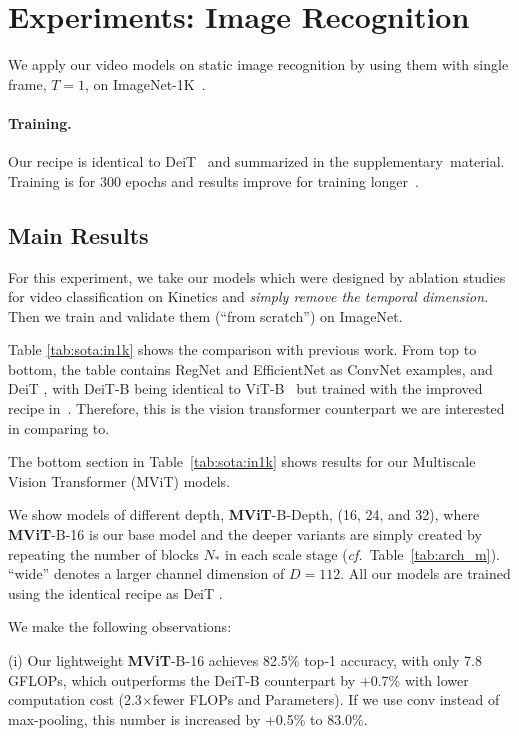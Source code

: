 \documentclass[10pt,twocolumn,letterpaper]{article}
\newcommand{\tblref}[1]{Table~\ref{#1}}
\def\x{$\times$}
\begin{document}
\section{Experiments: Image Recognition}\label{sec:imagenet}

We apply our video models on static image recognition by using them with single frame, $T=1$, on ImageNet-1K~\cite{Deng2009}.

\paragraph{Training.} Our recipe is identical to DeiT~\cite{touvron2020training} and summarized in the supplementary~material. Training  is for 300 epochs and results improve for training longer~\cite{touvron2020training}.

\subsection{Main Results}
For this experiment, we take our models which were designed by ablation studies for video classification on Kinetics and \textit{simply remove the temporal dimension}. Then we train and validate them (``from scratch'') on ImageNet.

Table \ref{tab:sota:in1k} shows the comparison with previous work. From top to bottom, the table contains RegNet \cite{ilija_2020}
and EfficientNet \cite{tan2019efficientnet} 
as ConvNet examples, and 
DeiT \cite{touvron2020training}, with  DeiT-B  being identical to ViT-B~\cite{dosovitskiy2020image} but trained with the improved recipe in~\cite{touvron2020training}. Therefore, this is the vision transformer counterpart we are interested in comparing to. 

The bottom section in \tblref{tab:sota:in1k} shows results for our Multiscale Vision Transformer (MViT) models. 

We show models of different depth, \textbf{MViT}-B-Depth, (16, 24, and 32), where \textbf{MViT}-B-16 is our base model and the deeper variants are simply created by repeating the number of blocks $N_*$ in each scale stage (\textit{cf.}~\tblref{tab:arch_m}). ``wide'' denotes a larger channel dimension of $D=112$. All our models are trained using the identical recipe as DeiT \cite{touvron2020training}.

We make the following observations: 

(i) Our lightweight \textbf{MViT}-B-16 achieves 82.5\% top-1 accuracy, with only 7.8 GFLOPs, which outperforms the DeiT-B counterpart by +0.7\% with lower computation cost (2.3\x fewer FLOPs and Parameters). If we use conv instead of max-pooling, this number is increased by +0.5\% to 83.0\%.
\end{document}
